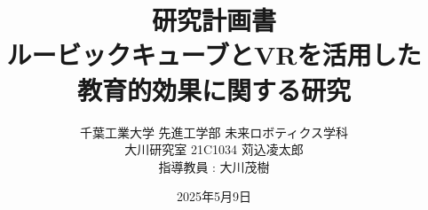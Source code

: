 \documentclass[uplatex,twocolumn]{jsarticle}
\begin{document}
 
\title{\large 研究計画書\\
\huge ルービックキューブとVRを活用した\\ 教育的効果に関する研究}
\author{千葉工業大学 先進工学部 未来ロボティクス学科\\
大川研究室 21C1034 苅込凌太郎\\
\small 指導教員 : 大川茂樹}
\date{2025年5月9日} 
\maketitle









\end{document}
